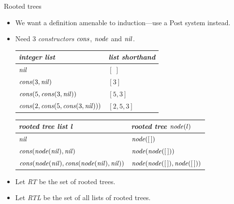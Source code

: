 \documentclass[style=sailor,size=12pt]{powerdot}
\newcommand{\id}[1]{\mbox{\it #1\/}}
\begin{document}
\begin{wideslide}[bm=,toc=]{Rooted trees}
\begin{itemize}
\item We want a definition amenable to induction---use a Post system instead.
\item Need 3 {\em constructors\/} $\id{cons}$, $\id{node}$ and $\id{nil}$.

\vspace{1em}
\begin{tabular}{|ll|} \hline
{\em integer list\/} & {\em list shorthand} \\ \hline
$\id{nil}$ & $[\;]$ \\
$\id{cons}(3,\id{nil})$ & $[3]$ \\
$\id{cons}(5,\id{cons}(3,\id{nil}))$ & $[5,3]$ \\
$\id{cons}(2,\id{cons}(5,\id{cons}(3,\id{nil})))$ & $[2,5,3]$ \\ \hline
\end{tabular}

\vspace{1em}
\begin{tabular}{|ll|} \hline
{\em rooted tree list l\/} & {\em rooted tree} $\id{node}(l)$  \\ \hline
$\id{nil}$ & $\id{node}([\,])$ \\
$\id{cons}(\id{node}(\id{nil}),\id{nil})$ & 
$\id{node}(\id{node}([\,]))$ \\
$\id{cons}(\id{node}(\id{nil}),\id{cons}(\id{node}(\id{nil}),\id{nil}))$ &
$\id{node}(\id{node}([\,]),\id{node}([\,]))$ \\ \hline
\end{tabular}
\vspace{1em}
\item Let {\em RT\/} be the set of rooted trees.
\item Let {\em RTL\/} be the set of all lists of rooted trees.
\end{itemize}
\end{wideslide}

 
\end{document}
